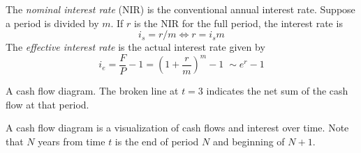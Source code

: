 \documentclass{tufte-book}
\begin{document}
\bigskip
{}
The \textit{nominal interest rate} (NIR) is the conventional annual interest rate. Suppose a period is divided by $m$. If $r$ is the NIR for the full period, the interest rate is
\begin{equation}
  i_s = r/m \iff r = i_s m
\end{equation}
The \textit{effective interest rate} is the actual interest rate given by \begin{equation}
  i_e = \frac{F}{P} - 1 = \left( 1 + \frac{r}{m} \right)^m - 1 \;\sim e^r - 1
\end{equation}
%
\begin{marginfigure}
  \begin{center}
     \phantom{mm}
  \end{center}
  \caption{A cash flow diagram. The broken line at $t=3$ indicates the net sum of the cash flow at that period.}
\end{marginfigure}
%
A cash flow diagram is a visualization of cash flows and interest over time. Note that $N$ years from time $t$ is the end of period $N$ and beginning of $N+1$.
\end{document}
